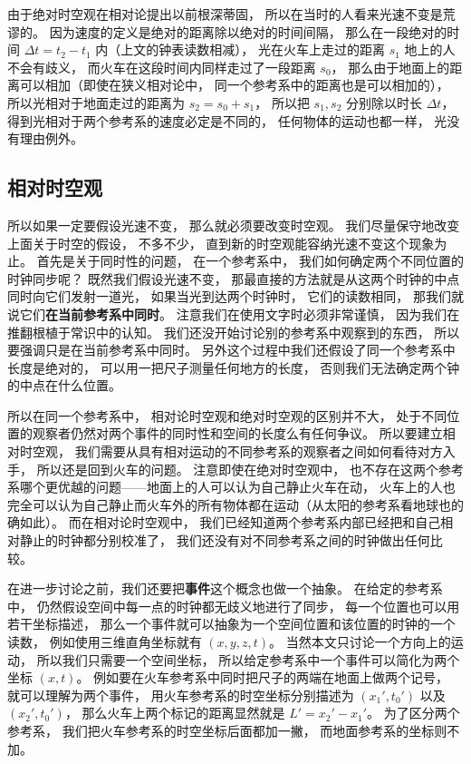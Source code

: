 由于绝对时空观在相对论提出以前根深蒂固， 所以在当时的人看来光速不变是荒谬的。 因为速度的定义是绝对的距离除以绝对的时间间隔， 那么在一段绝对的时间 $\Delta t = t_2 - t_1$ 内（上文的钟表读数相减）， 光在火车上走过的距离 $s_1$ 地上的人不会有歧义， 而火车在这段时间内同样走过了一段距离 $s_0$， 那么由于地面上的距离可以相加（即使在狭义相对论中， 同一个参考系中的距离也是可以相加的）， 所以光相对于地面走过的距离为 $s_2 = s_0 + s_1$， 所以把 $s_1, s_2$ 分别除以时长 $\Delta t$， 得到光相对于两个参考系的速度必定是不同的， 任何物体的运动也都一样， 光没有理由例外。

\subsection{相对时空观}
所以如果一定要假设光速不变， 那么就必须要改变时空观。 我们尽量保守地改变上面关于时空的假设， 不多不少， 直到新的时空观能容纳光速不变这个现象为止。 首先是关于同时性的问题， 在一个参考系中， 我们如何确定两个不同位置的时钟同步呢？ 既然我们假设光速不变， 那最直接的方法就是从这两个时钟的中点同时向它们发射一道光， 如果当光到达两个时钟时， 它们的读数相同， 那我们就说它们\textbf{在当前参考系中同时}。 注意我们在使用文字时必须非常谨慎， 因为我们在推翻根植于常识中的认知。 我们还没开始讨论别的参考系中观察到的东西， 所以要强调只是在当前参考系中同时。 另外这个过程中我们还假设了同一个参考系中长度是绝对的， 可以用一把尺子测量任何地方的长度， 否则我们无法确定两个钟的中点在什么位置。

所以在同一个参考系中， 相对论时空观和绝对时空观的区别并不大， 处于不同位置的观察者仍然对两个事件的同时性和空间的长度么有任何争议。 所以要建立相对时空观， 我们需要从具有相对运动的不同参考系的观察者之间如何看待对方入手， 所以还是回到火车的问题。 注意即使在绝对时空观中， 也不存在这两个参考系哪个更优越的问题——地面上的人可以认为自己静止火车在动， 火车上的人也完全可以认为自己静止而火车外的所有物体都在运动（从太阳的参考系看地球也的确如此）。 而在相对论时空观中， 我们已经知道两个参考系内部已经把和自己相对静止的时钟都分别校准了， 我们还没有对不同参考系之间的时钟做出任何比较。

在进一步讨论之前，我们还要把\textbf{事件}这个概念也做一个抽象。 在给定的参考系中， 仍然假设空间中每一点的时钟都无歧义地进行了同步， 每一个位置也可以用若干坐标描述， 那么一个事件就可以抽象为一个空间位置和该位置的时钟的一个读数， 例如使用三维直角坐标就有 $(x, y, z, t)$。 当然本文只讨论一个方向上的运动， 所以我们只需要一个空间坐标， 所以给定参考系中一个事件可以简化为两个坐标 $(x, t)$。 例如要在火车参考系中同时把尺子的两端在地面上做两个记号， 就可以理解为两个事件， 用火车参考系的时空坐标分别描述为 $(x_1', t_0')$ 以及 $(x_2', t_0')$， 那么火车上两个标记的距离显然就是 $L' = x_2' - x_1'$。 为了区分两个参考系， 我们把火车参考系的时空坐标后面都加一撇， 而地面参考系的坐标则不加。

